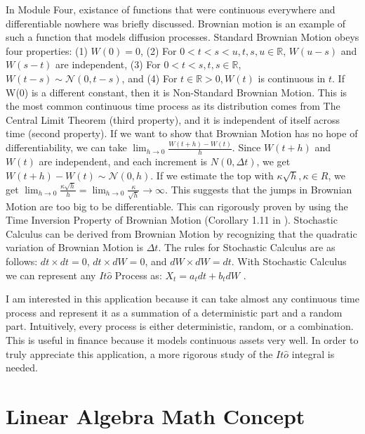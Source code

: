 \documentclass[final]{siamart1116}
\begin{document}
In Module Four, existance of functions that were continuous everywhere and differentiable nowhere was briefly discussed. Brownian motion is an example of such a function that models diffusion processes. Standard Brownian Motion obeys four properties: (1) $W(0) = 0$, (2) For $0 < t < s < u, t, s, u \in \mathbb{R}$, $W(u - s)$ and $W(s - t)$ are independent, (3) For $0 < t < s, t, s \in \mathbb{R}$, $W(t - s) \sim \mathcal{N}(0, t - s)$, and (4) For $t \in \mathbb{R} > 0, W(t)$ is continuous in $t$. If W(0) is a different constant, then it is Non-Standard Brownian Motion. This is the most common continuous time process as its distribution comes from The Central Limit Theorem (third property), and it is independent of itself across time (second property). If we want to show that Brownian Motion has no hope of differentiability, we can take $\lim_{h \to 0} \frac{W(t + h) - W(t)}{h}$. Since $W(t + h)$ and $W(t)$ are independent, and each increment is $N(0,\Delta t)$, we get $W(t + h) - W(t) \sim \mathcal{N}(0, h)$. If we estimate the top with $\kappa \sqrt{h}, \kappa \in R$, we get $\lim_{h \to 0} \frac{\kappa \sqrt{h}}{h} = \lim_{h \to 0} \frac{\kappa}{\sqrt{h}} \to \infty$. This suggests that the jumps in Brownian Motion are too big to be differentiable. This can rigorously proven by using the Time Inversion Property of Brownian Motion (Corollary 1.11 in \cite{peres}). Stochastic Calculus can be derived from Brownian Motion by recognizing that the quadratic variation of Brownian Motion is $\Delta t$. The rules for Stochastic Calculus are as follows: $dt\times dt = 0$, $dt\times dW = 0$, and $dW\times dW = dt$. With Stochastic Calculus we can represent any $It\hat{o}$ Process as: $X_t = a_{t}dt + b_{t}dW$ \cite{columbia_lecture}.

I am interested in this application because it can take almost any continuous time process and represent it as a summation of a deterministic part and a random part. Intuitively, every process is either deterministic, random, or a combination. This is useful in finance because it models continuous assets very well. In order to truly appreciate this application, a more rigorous study of the $It\hat{o}$ integral is needed.

\section{Linear Algebra Math Concept}
\end{document}
